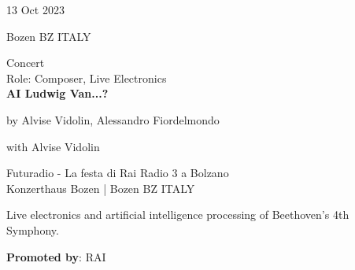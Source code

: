 \documentclass[7pt,a4paper]{article}
\begin{document}
\begin{mdframed}[
    backgroundcolor=entrygray,
    linecolor=entrygray,
    linewidth=0pt,
    innerleftmargin=6pt,
    innerrightmargin=6pt,
    innertopmargin=6pt,
    innerbottommargin=6pt,
    skipabove=0pt,
    skipbelow=0pt
]

\begin{minipage}[t]{0.28\textwidth}

13 Oct 2023

\scriptsize Bozen BZ ITALY


\end{minipage}
\begin{minipage}[t]{0.68\textwidth}
\small Concert
\\\scriptsize Role: Composer, Live Electronics
\\ \normalsize \textbf{AI Ludwig Van...?}
\par\scriptsize by Alvise Vidolin, Alessandro Fiordelmondo
\par\scriptsize with Alvise Vidolin
\vspace{0.25cm}



\small Futuradio - La festa di Rai Radio 3 a Bolzano\\Konzerthaus Bozen | \scriptsize Bozen BZ ITALY

\vspace{0.1cm}
\scriptsize

Live electronics and artificial intelligence processing of Beethoven's 4th Symphony.

\vspace{0.1cm}
\par \textbf{Promoted by}: RAI
\end{minipage}
\vspace{0.25cm}
\end{mdframed}
\end{document}
